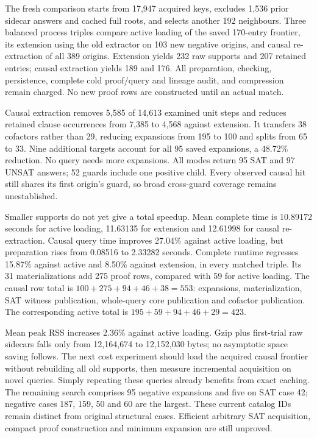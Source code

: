 \documentclass[11pt,a4paper]{article}
\numberwithin{equation}{section}
\theoremstyle{plain}
\theoremstyle{definition}
\theoremstyle{remark}
\begin{document}
The fresh comparison starts from 17,947 acquired keys, excludes 1,536 prior
sidecar answers and cached full roots, and selects another 192 neighbours.
Three balanced process triples compare active loading of the saved 170-entry
frontier, its extension using the old extractor on 103 new negative origins,
and causal re-extraction of all 389 origins. Extension yields 232 raw supports
and 207 retained entries; causal extraction yields 189 and 176. All preparation,
checking, persistence, complete cold proof/query and lineage audit, and compression
remain charged. No new proof rows are constructed until an actual match.

Causal extraction removes 5,585 of 14,613 examined unit steps and reduces retained
clause occurrences from 7,385 to 4,568 against extension. It transfers 38 cofactors
rather than 29, reducing expansions from 195 to 100 and splits from 65 to 33.
Nine additional targets account for all 95 saved expansions, a 48.72\% reduction.
No query needs more expansions. All modes return 95 SAT and 97 UNSAT answers;
52 guards include one positive child. Every observed causal hit still shares
its first origin's guard, so broad cross-guard coverage remains unestablished.

Smaller supports do not yet give a total speedup. Mean complete time is 10.89172
seconds for active loading, 11.63135 for extension and 12.61998 for causal
re-extraction. Causal query time improves 27.04\% against active loading, but
preparation rises from 0.08516 to 2.33282 seconds. Complete runtime regresses
15.87\% against active and 8.50\% against extension, in every matched triple.
Its 31 materializations add 275 proof rows, compared with 59 for active loading.
The causal row total is $100+275+94+46+38=553$: expansions, materialization,
SAT witness publication, whole-query core publication and cofactor publication.
The corresponding active total is $195+59+94+46+29=423$.

Mean peak RSS increases 2.36\% against active loading. Gzip plus first-trial raw
sidecars falls only from 12,164,674 to 12,152,030 bytes; no asymptotic space saving
follows. The next cost experiment should load the acquired causal frontier
without rebuilding all old supports, then measure incremental acquisition on
novel queries. Simply repeating these queries already benefits from exact
caching. The remaining search comprises 95 negative expansions and five on
SAT case 42; negative cases 187, 159, 50 and 60 are the largest. These current
catalog IDs remain distinct from original structural cases. Efficient arbitrary
SAT acquisition, compact proof construction and minimum expansion are still
unproved.
\end{document}
